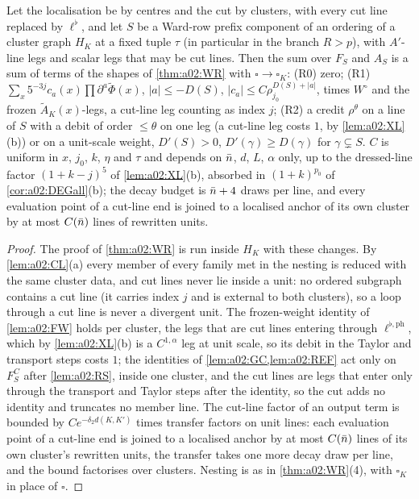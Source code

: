 \begin{theorem}\label{thm:a02:WRall}
Let the localisation be by centres and the cut by clusters, with every cut line replaced by $\ell^\flat$, and let $S$ be a Ward-row prefix component of an ordering of a cluster graph $H_K$ at a fixed tuple $\tau$ (in particular in the branch $R>p$), with $A'$-line legs and scalar legs that may be cut lines. Then the sum over $F_S$ and $A_S$ is a sum of terms of the shapes of \cref{thm:a02:WR} with $\square\to\square_K$: \textup{(R0)} zero; \textup{(R1)} $\sum_x5^{-3j}c_a(x)\prod\partial^a\tilde\Phi(x)$, $|a|\le-D(S)$, $|c_a|\le C\rho_{j_0}^{D(S)+|a|}$, times $W^\circ$ and the frozen $\tilde A_K(x)$-legs, a cut-line leg counting as index $j$; \textup{(R2)} a credit $\rho^\theta$ on a line of $S$ with a debit of order $\le\theta$ on one leg (a cut-line leg costs $1$, by \cref{lem:a02:XL}(b)) or on a unit-scale weight, $D'(S)>0$, $D'(\gamma)\ge D(\gamma)$ for $\gamma\subsetneq S$. $C$ is uniform in $x$, $j_0$, $k$, $\eta$ and $\tau$ and depends on $\bar n$, $d$, $L$, $\alpha$ only, up to the dressed-line factor $(1+k-j)^5$ of \cref{lem:a02:XL}(b), absorbed in $(1+k)^{p_0}$ of \cref{cor:a02:DEGall}(b); the decay budget is $\bar n+4$ draws per line, and every evaluation point of a cut-line end is joined to a localised anchor of its own cluster by at most $C(\bar n)$ lines of rewritten units.
\end{theorem}
\begin{proof}
The proof of \cref{thm:a02:WR} is run inside $H_K$ with these changes. By \cref{lem:a02:CL}(a) every member of every family met in the nesting is reduced with the same cluster data, and cut lines never lie inside a unit: no ordered subgraph contains a cut line (it carries index $j$ and is external to both clusters), so a loop through a cut line is never a divergent unit. The frozen-weight identity of \cref{lem:a02:FW} holds per cluster, the legs that are cut lines entering through $\ell^{\flat,\mathrm{ph}}$, which by \cref{lem:a02:XL}(b) is a $C^{1,\alpha}$ leg at unit scale, so its debit in the Taylor and transport steps costs $1$; the identities of \cref{lem:a02:GC,lem:a02:REF} act only on $F^C_S$ after \cref{lem:a02:RS}, inside one cluster, and the cut lines are legs that enter only through the transport and Taylor steps after the identity, so the cut adds no identity and truncates no member line. The cut-line factor of an output term is bounded by $Ce^{-\delta_2d(K,K')}$ times transfer factors on unit lines: each evaluation point of a cut-line end is joined to a localised anchor by at most $C(\bar n)$ lines of its own cluster's rewritten units, the transfer takes one more decay draw per line, and the bound factorises over clusters. Nesting is as in \cref{thm:a02:WR}(4), with $\square_K$ in place of $\square$.
\end{proof}

